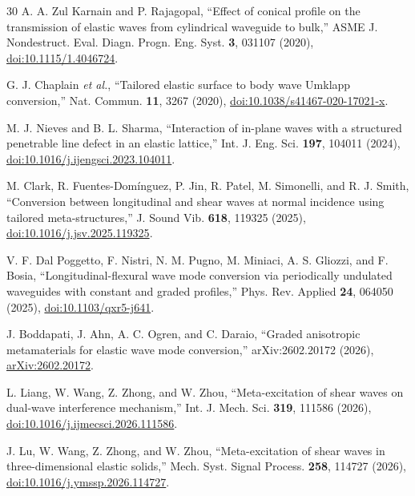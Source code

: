 \documentclass[10pt,aps,onecolumn,floatfix,notitlepage,nofootinbib,showkeys]{revtex4-2}
\begin{document}
\begin{thebibliography}{30}
A. A. Zul Karnain and P. Rajagopal,
``Effect of conical profile on the transmission of elastic waves from cylindrical waveguide to bulk,''
ASME J. Nondestruct. Eval. Diagn. Progn. Eng. Syst. \textbf{3}, 031107 (2020),
\href{https://doi.org/10.1115/1.4046724}{doi:10.1115/1.4046724}.

G. J. Chaplain \textit{et al.},
``Tailored elastic surface to body wave Umklapp conversion,''
Nat. Commun. \textbf{11}, 3267 (2020),
\href{https://doi.org/10.1038/s41467-020-17021-x}{doi:10.1038/s41467-020-17021-x}.

M. J. Nieves and B. L. Sharma,
``Interaction of in-plane waves with a structured penetrable line defect in an elastic lattice,''
Int. J. Eng. Sci. \textbf{197}, 104011 (2024),
\href{https://doi.org/10.1016/j.ijengsci.2023.104011}{doi:10.1016/j.ijengsci.2023.104011}.

M. Clark, R. Fuentes-Dom\'inguez, P. Jin, R. Patel, M. Simonelli, and R. J. Smith,
``Conversion between longitudinal and shear waves at normal incidence using tailored meta-structures,''
J. Sound Vib. \textbf{618}, 119325 (2025),
\href{https://doi.org/10.1016/j.jsv.2025.119325}{doi:10.1016/j.jsv.2025.119325}.

V. F. Dal Poggetto, F. Nistri, N. M. Pugno, M. Miniaci, A. S. Gliozzi, and F. Bosia,
``Longitudinal-flexural wave mode conversion via periodically undulated waveguides with constant and graded profiles,''
Phys. Rev. Applied \textbf{24}, 064050 (2025),
\href{https://doi.org/10.1103/qxr5-j641}{doi:10.1103/qxr5-j641}.

J. Boddapati, J. Ahn, A. C. Ogren, and C. Daraio,
``Graded anisotropic metamaterials for elastic wave mode conversion,''
arXiv:2602.20172 (2026),
\href{https://arxiv.org/abs/2602.20172}{arXiv:2602.20172}.

L. Liang, W. Wang, Z. Zhong, and W. Zhou,
``Meta-excitation of shear waves on dual-wave interference mechanism,''
Int. J. Mech. Sci. \textbf{319}, 111586 (2026),
\href{https://doi.org/10.1016/j.ijmecsci.2026.111586}{doi:10.1016/j.ijmecsci.2026.111586}.

J. Lu, W. Wang, Z. Zhong, and W. Zhou,
``Meta-excitation of shear waves in three-dimensional elastic solids,''
Mech. Syst. Signal Process. \textbf{258}, 114727 (2026),
\href{https://doi.org/10.1016/j.ymssp.2026.114727}{doi:10.1016/j.ymssp.2026.114727}.


\end{thebibliography}
\end{document}
